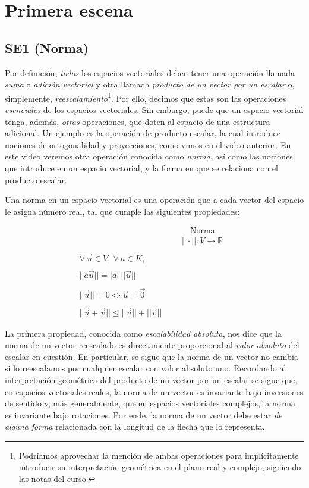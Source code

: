 \documentclass[12pt,dvipsnames]{article}
\numberwithin{equation}{section}
\begin{document}

\newpage
\section{Primera escena}

\subsection{SE1 (Norma)}

Por definición, \emph{todos} los espacios vectoriales deben tener una operación llamada \emph{suma} o \emph{adición vectorial} y otra llamada \emph{producto de un vector por un escalar} o, simplemente, \emph{reescalamiento}\footnote{Podríamos aprovechar la mención de ambas operaciones para implícitamente introducir su interpretación geométrica en el plano real y complejo, siguiendo las notas del curso.}. Por ello, decimos que estas son las operaciones \emph{esenciales} de los espacios vectoriales. Sin embargo, puede que un espacio vectorial tenga, además, \emph{otras} operaciones, que doten al espacio de una estructura adicional. Un ejemplo es la operación de producto escalar, la cual introduce nociones de ortogonalidad y proyecciones, como vimos en el video anterior. En este video veremos otra operación conocida como \emph{norma}, así como las nociones que introduce en un espacio vectorial, y la forma en que se relaciona con el producto escalar.

Una norma en un espacio vectorial es una operación que a cada vector del espacio le asigna número real, tal que cumple las siguientes propiedades:

\begin{align*}
     & & &\quad \text{Norma}& \\
     & & &||\cdot||:V\to \mathbb{R}& \\
     \\
     \forall \ \vec{u}\in V, \ \forall \ a\in K, \\
     \\
     ||a\vec{u}|| = |a| \ ||\vec{u}||\\
     \\
     ||\vec{u}|| = 0 \iff \vec{u} = \vec{0}\\
     \\
     ||\vec{u}+\vec{v}|| \le ||\vec{u}|| + ||\vec{v}||
\end{align*}

La primera propiedad, conocida como \emph{escalabilidad absoluta}, nos dice que la norma de un vector reescalado es directamente proporcional al \emph{valor absoluto} del escalar en cuestión. En particular, se sigue que la norma de un vector no cambia si lo reescalamos por cualquier escalar con valor absoluto uno. Recordando al interpretación geométrica del producto de un vector por un escalar se sigue que, en espacios vectoriales reales, la norma de un vector es invariante bajo inversiones de sentido y, más generalmente, que en espacios vectoriales complejos, la norma es invariante bajo rotaciones. Por ende, la norma de un vector debe estar \emph{de alguna forma} relacionada con la longitud de la flecha que lo representa.
\end{document}
